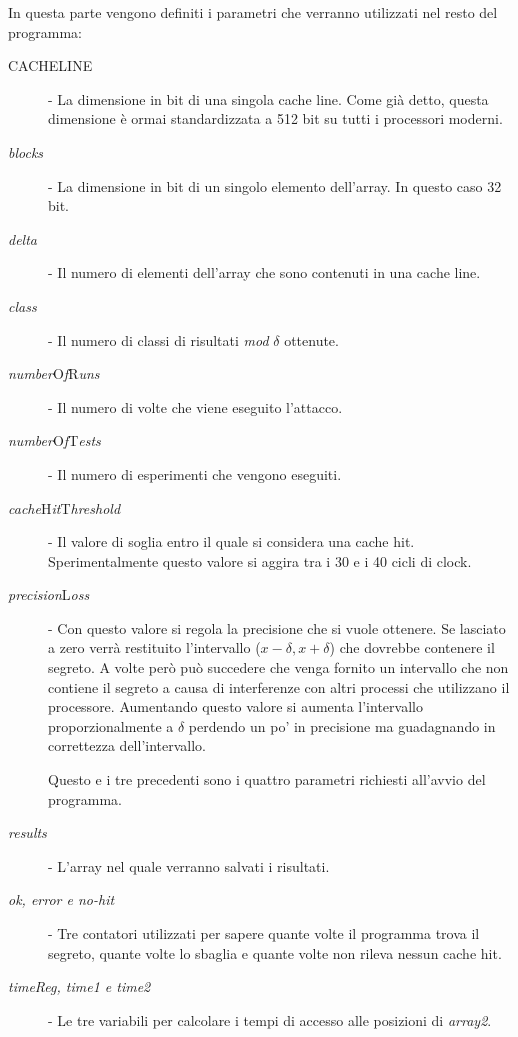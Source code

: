 				In questa parte vengono definiti i parametri che verranno utilizzati nel resto del programma:
				\begin{description}
					\item [CACHELINE] - La dimensione in bit di una singola cache line. Come già detto, questa dimensione è ormai standardizzata a 512 bit su tutti i processori moderni.
					\item [\emph{blocks}] - La dimensione in bit di un singolo elemento dell'array. In questo caso 32 bit.
					\item [\emph{delta}] - Il numero di elementi dell'array che sono contenuti in una cache line.
					\item [\emph{class}] - Il numero di classi di risultati \emph{mod} $\delta$ ottenute.
					\item [\emph{number}O\emph{f}R\emph{uns}] - Il numero di volte che viene eseguito l'attacco.
					\item [\emph{number}O\emph{f}T\emph{ests}] - Il numero di esperimenti che vengono eseguiti.
					\item [\emph{cache}H\emph{it}T\emph{hreshold}] - Il valore di soglia entro il quale si considera una cache hit. Sperimentalmente questo valore si aggira tra i 30 e i 40 cicli di clock.
					\item [\emph{precision}L\emph{oss}] - Con questo valore si regola la precisione che si vuole ottenere. Se lasciato a zero verrà restituito l'intervallo ($x-\delta, x+\delta$) che dovrebbe contenere il segreto. A volte però può succedere che venga fornito un intervallo che non contiene il segreto a causa di interferenze con altri processi che utilizzano il processore. Aumentando questo valore si aumenta l'intervallo proporzionalmente a $\delta$ perdendo un po' in precisione ma guadagnando in correttezza dell'intervallo.
					
					Questo e i tre precedenti sono i quattro parametri richiesti all'avvio del programma.
					\item[\emph{results}] - L'array nel quale verranno salvati i risultati.
					\item[\emph{ok, error e no-hit}] - Tre contatori utilizzati per sapere quante volte il programma trova il segreto, quante volte lo sbaglia e quante volte non rileva nessun cache hit.
					\item[\emph{timeReg, time1 e time2}] -  Le tre variabili per calcolare i tempi di accesso alle posizioni di \emph{array2}.
				\end{description}
			
